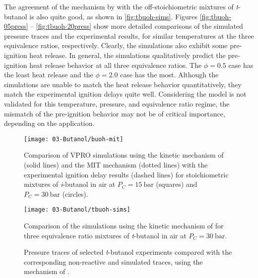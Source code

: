 \documentclass[12pt, letterpaper]{article}
\begin{document}
The agreement of the mechanism by \textcite{Sarathy2012} with the
off-stoichiometric mixtures of \textit{t}-butanol is also quite good, as shown
in \autoref{fig:tbuoh-sims}. Figures \ref{fig:tbuoh-05press}
-- \ref{fig:tbuoh-20press} show more detailed comparisons
of the simulated pressure traces and the experimental results, for similar
temperatures at the three equivalence ratios, respectively. Clearly, the
simulations also exhibit some pre-ignition heat release. In general, the
simulations qualitatively predict the pre-ignition heat release behavior at all
three equivalence ratios. The $\phi=\num{0.5}$ case has the least heat release and
the $\phi=\num{2.0}$ case has the most. Although the simulations are unable to match
the heat release behavior quantitatively, they match the experimental ignition
delays quite well. Considering the model is not validated for this temperature,
pressure, and equivalence ratio regime, the mismatch of the pre-ignition
behavior may not be of critical importance, depending on the application.

\begin{figure}
    \begin{floatrow}
        \ffigbox
            {\texttt{[image: 03-Butanol/buoh-mit]}}
            {\caption{Comparison of VPRO simulations using the kinetic mechanism of
                \textcite{Sarathy2012} (solid lines) and the MIT mechanism
                \cite{Hansen2013,Merchant2013} (dotted lines) with the experimental
                ignition delay results (dashed lines) for stoichiometric mixtures of
                \textit{i}-butanol in air at $P_C=\SI{15}{\bar}$ (squares) and $P_C=\SI{30}{\bar}$
                (circles).}
            \label{fig:buoh-mit}}
        \ffigbox
            {\texttt{[image: 03-Butanol/tbuoh-sims]}}
            {\caption{Comparison of the simulations using the kinetic mechanism of
                \textcite{Sarathy2012} for three equivalence ratio mixtures of
                \textit{t}-butanol in air at $P_C=\SI{30}{\bar}$.}
            \label{fig:tbuoh-sims}}
    \end{floatrow}
\end{figure}

\begin{figure}
    {\caption{Pressure traces of selected
     \textit{t}-butanol experiments compared with the corresponding
     non-reactive and simulated traces, using the mechanism of
     \textcite{Sarathy2012}.}
    }
\end{figure}
\end{document}
